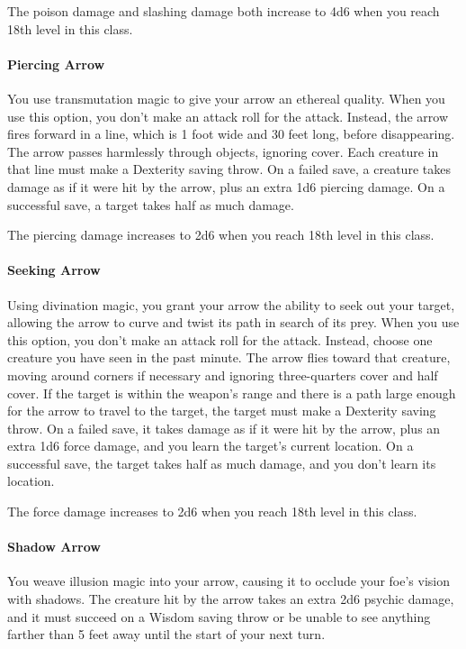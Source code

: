 \documentclass[letterpaper,openany,oneside,twocolumn]{book}
\begin{document}
The poison damage and slashing damage both increase to 4d6 when you reach 18th level in this class.

\eject

\paragraph{Piercing Arrow} You use transmutation magic to give your arrow an ethereal quality. When you use this option, you don’t make an attack roll for the attack. Instead, the arrow fires forward in a line, which is 1 foot wide and 30 feet long, before disappearing. The arrow passes harmlessly through objects, ignoring cover. Each creature in that line must make a Dexterity saving throw. On a failed save, a creature takes damage as if it were hit by the arrow, plus an extra 1d6 piercing damage. On a successful save, a target takes half as much damage.

The piercing damage increases to 2d6 when you reach 18th level in this class.

\paragraph{Seeking Arrow} Using divination magic, you grant your arrow the ability to seek out your target, allowing the arrow to curve and twist its path in search of its prey. When you use this option, you don’t make an attack roll for the attack. Instead, choose one creature you have seen in the past minute. The arrow flies toward that creature, moving around corners if necessary and ignoring three-quarters cover and half cover. If the target is within the weapon’s range and there is a path large enough for the arrow to travel to the target, the target must make a Dexterity saving throw. On a failed save, it takes damage as if it were hit by the arrow, plus an extra 1d6 force damage, and you learn the target’s current location. On a successful save, the target takes half as much damage, and you don’t learn its location.

The force damage increases to 2d6 when you reach 18th level in this class.

\paragraph{Shadow Arrow} You weave illusion magic into your arrow, causing it to occlude your foe’s vision with shadows. The creature hit by the arrow takes an extra 2d6 psychic damage, and it must succeed on a Wisdom saving throw or be unable to see anything farther than 5 feet away until the start of your next turn.
\end{document}
